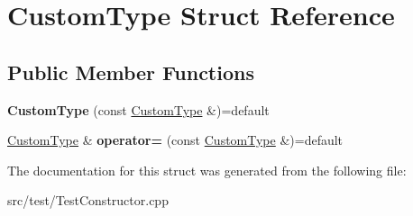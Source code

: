 \hypertarget{structCustomType}{}\section{Custom\+Type Struct Reference}
\label{structCustomType}
\subsection*{Public Member Functions}
\begin{DoxyCompactItemize}
\item 
\mbox{\label{structCustomType_a2947ecc79f68fa90d6a63756c04ad30f}} 
{\bfseries Custom\+Type} (const \hyperlink{structCustomType}{Custom\+Type} \&)=default
\item 
\mbox{\label{structCustomType_af47762bc289443e08384ab197421c411}} 
\hyperlink{structCustomType}{Custom\+Type} \& {\bfseries operator=} (const \hyperlink{structCustomType}{Custom\+Type} \&)=default
\end{DoxyCompactItemize}


The documentation for this struct was generated from the following file\+:\begin{DoxyCompactItemize}
\item 
src/test/Test\+Constructor.\+cpp\end{DoxyCompactItemize}
